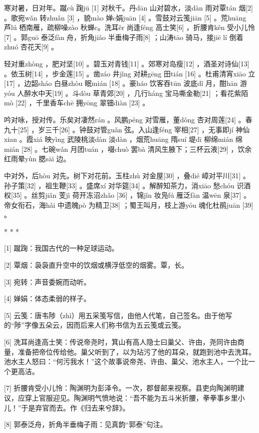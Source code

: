 \documentclass[12pt,UTF8]{ctexbook}
\begin{document}
寒对暑，日对年。蹴cù 踘jū [1] 对秋千。丹dān 山对碧水，淡dàn 雨对覃tán 烟[2] 。歌宛wǎn 转zhuǎn [3] ，貌mào 婵c娟juān [4] 。雪鼓对云笺jiān [5] 。荒huāng 芦lú 栖南雁，疏柳噪zào 秋蝉c。洗耳ěr 尚逢féng 高士笑[6] ，折腰肯kěn 受小儿怜[7] 。郭guō 泰泛fàn 舟，折角jiǎo 半垂梅子雨[8] ；山涛tāo 骑马，接jiē lí 倒着zhuó 杏花天[9] 。

轻对重zhòng ，肥对坚[10] 。碧玉对青钱[11] 。郊寒对岛瘦[12] ，酒圣对诗仙[13] 。依玉树[14] ，步金莲[15] 。凿záo 井jǐng 对耕gēng 田tián [16] 。杜甫清宵xiāo 立[17] ，边韶sháo 白昼zhòu 眠mián [18] 。豪háo 饮客吞tūn 波底dǐ 月，酣hān 游yóu 人醉水中天[19] 。斗dòu 草青郊[20] ，几行háng 宝马嘶金勒[21] ；看花紫陌mò [22] ，千里香车chē 拥yōng 翠钿diàn [23] 。

吟对咏，授对传。乐矣对凄然rán 。风鹏péng 对雪雁，董dǒng 杏对周莲[24] 。春九十[25] ，岁三千[26] 。钟鼓对管guǎn 弦。入山逢féng 宰相[27] ，无事即jí 神仙xian 。霞xiá 映yìng 武陵桃淡dàn 淡dàn ，烟荒huāng 隋suí 堤dī 柳绵mián 绵mián [28] 。七碗wǎn 月团tuán ，啜chuò 罢bà 清风生腋下；三杯云液[29] ，饮余红雨晕yùn 腮sāi 边。

中对外，后hòu 对先。树下对花前。玉柱zhù 对金屋[30] ，叠dié 嶂对平川[31] 。孙子策[32] ，祖生鞭[33] 。盛席xí 对华筵[34] 。解醉知茶力，消xiāo 愁chóu 识酒权[35] 。丝剪jiǎn 芰jì 荷开冻沼zhǎo [36] ，锦jǐn 妆凫fú 雁泛fàn 温wēn 泉[37] 。帝女衔石，海hǎi 中遗魄pò 为精卫[38] ；蜀王叫月，枝上游yóu 魂化杜鹃juān [39] 。



* * *



[1] 蹴踘：我国古代的一种足球运动。

[2] 覃烟：袅袅直升空中的饮烟或横浮低空的烟雾。覃，长。

[3] 宛转：声音委婉而动听。

[4] 婵娟：体态柔弱的样子。

[5] 云笺：唐韦陟（zhì）用五采笺写信，由他人代笔，自己签名。由于他写的“陟”字像五朵云，因而后来人们称书信为五云笺或云笺。

[6] 洗耳尚逢高士笑：传说帝尧时，箕山有高人隐士曰巢父、许由，尧同许由商量，准备把帝位传给他。巢父听到了，以为玷污了他的耳朵，就跑到池中去洗耳。池水主人怒曰：“何污我水！”这个故事说帝尧、许由、巢父、池水主人，一个比一个更高洁。

[7] 折腰肯受小儿怜：陶渊明为彭泽令。一次，郡督邮来视察。县吏向陶渊明建议，应穿上官服迎见。陶渊明气愤地说：“吾不能为五斗米折腰，拳拳事乡里小儿！”于是弃官而去。作《归去来兮辞》。

[8] 郭泰泛舟，折角半垂梅子雨：见真韵“郭泰”句注。
\end{document}
